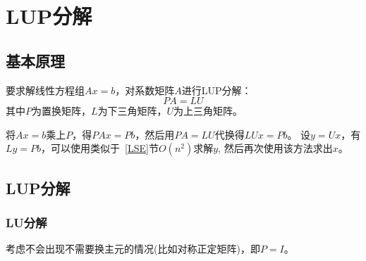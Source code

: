 \section{LUP分解}
\subsection{基本原理}
要求解线性方程组$Ax=b$，对系数矩阵$A$进行LUP分解：
\begin{displaymath}
	PA=LU
\end{displaymath}
其中$P$为置换矩阵，$L$为下三角矩阵，$U$为上三角矩阵。

将$Ax=b$乘上$P$，得$PAx=Pb$，然后用$PA=LU$代换得$LUx=Pb$。
设$y=Ux$，有$Ly=Pb$，可以使用类似于~\ref{LSE}节$O(n^2)$求解$y$,
然后再次使用该方法求出$x$。

\subsection{LUP分解}
\subsubsection{LU分解}
考虑不会出现不需要换主元的情况(比如对称正定矩阵)，即$P=I$。

